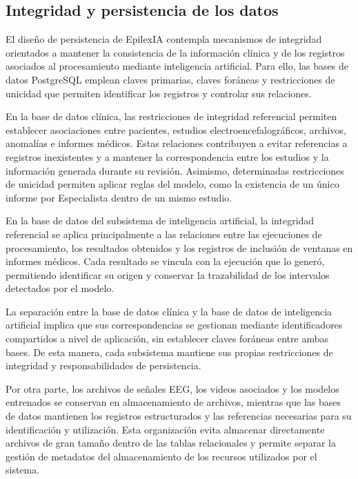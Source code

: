 \subsection{Integridad y persistencia de los datos}
\label{subsec:integridad-persistencia-datos}

El diseño de persistencia de EpilexIA contempla mecanismos
de integridad orientados a mantener la consistencia de
la información clínica y de los registros asociados al
procesamiento mediante inteligencia artificial. Para ello,
las bases de datos PostgreSQL emplean claves primarias,
claves foráneas y restricciones de unicidad que permiten
identificar los registros y controlar sus relaciones.

En la base de datos clínica, las restricciones de integridad
referencial permiten establecer asociaciones entre pacientes,
estudios electroencefalográficos, archivos, anomalías e
informes médicos. Estas relaciones contribuyen a evitar
referencias a registros inexistentes y a mantener la
correspondencia entre los estudios y la información generada
durante su revisión. Asimismo, determinadas restricciones
de unicidad permiten aplicar reglas del modelo, como la
existencia de un único informe por Especialista dentro
de un mismo estudio.

En la base de datos del subsistema de inteligencia artificial,
la integridad referencial se aplica principalmente a las
relaciones entre las ejecuciones de procesamiento, los
resultados obtenidos y los registros de inclusión de ventanas
en informes médicos. Cada resultado se vincula con la
ejecución que lo generó, permitiendo identificar su origen
y conservar la trazabilidad de los intervalos detectados
por el modelo.

La separación entre la base de datos clínica y la base
de datos de inteligencia artificial implica que sus
correspondencias se gestionan mediante identificadores
compartidos a nivel de aplicación, sin establecer claves
foráneas entre ambas bases. De esta manera, cada subsistema
mantiene sus propias restricciones de integridad y
responsabilidades de persistencia.

Por otra parte, los archivos de señales EEG, los videos
asociados y los modelos entrenados se conservan en
almacenamiento de archivos, mientras que las bases de datos
mantienen los registros estructurados y las referencias
necesarias para su identificación y utilización. Esta
organización evita almacenar directamente archivos de gran
tamaño dentro de las tablas relacionales y permite separar
la gestión de metadatos del almacenamiento de los recursos
utilizados por el sistema.

